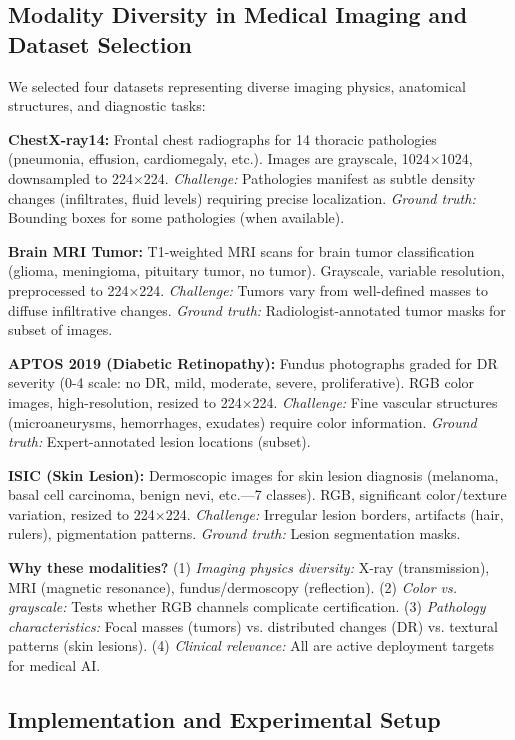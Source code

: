 \documentclass[11pt]{article}
\begin{document}
\subsection{Modality Diversity in Medical Imaging and Dataset Selection}

We selected four datasets representing diverse imaging physics, anatomical structures, and diagnostic tasks:

\textbf{ChestX-ray14:} Frontal chest radiographs for 14 thoracic pathologies (pneumonia, effusion, cardiomegaly, etc.). Images are grayscale, 1024×1024, downsampled to 224×224. \textit{Challenge:} Pathologies manifest as subtle density changes (infiltrates, fluid levels) requiring precise localization. \textit{Ground truth:} Bounding boxes for some pathologies (when available).

\textbf{Brain MRI Tumor:} T1-weighted MRI scans for brain tumor classification (glioma, meningioma, pituitary tumor, no tumor). Grayscale, variable resolution, preprocessed to 224×224. \textit{Challenge:} Tumors vary from well-defined masses to diffuse infiltrative changes. \textit{Ground truth:} Radiologist-annotated tumor masks for subset of images.

\textbf{APTOS 2019 (Diabetic Retinopathy):} Fundus photographs graded for DR severity (0-4 scale: no DR, mild, moderate, severe, proliferative). RGB color images, high-resolution, resized to 224×224. \textit{Challenge:} Fine vascular structures (microaneurysms, hemorrhages, exudates) require color information. \textit{Ground truth:} Expert-annotated lesion locations (subset).

\textbf{ISIC (Skin Lesion):} Dermoscopic images for skin lesion diagnosis (melanoma, basal cell carcinoma, benign nevi, etc.—7 classes). RGB, significant color/texture variation, resized to 224×224. \textit{Challenge:} Irregular lesion borders, artifacts (hair, rulers), pigmentation patterns. \textit{Ground truth:} Lesion segmentation masks.

\textbf{Why these modalities?} (1) \textit{Imaging physics diversity:} X-ray (transmission), MRI (magnetic resonance), fundus/dermoscopy (reflection). (2) \textit{Color vs. grayscale:} Tests whether RGB channels complicate certification. (3) \textit{Pathology characteristics:} Focal masses (tumors) vs. distributed changes (DR) vs. textural patterns (skin lesions). (4) \textit{Clinical relevance:} All are active deployment targets for medical AI.

\subsection{Implementation and Experimental Setup}
\end{document}
